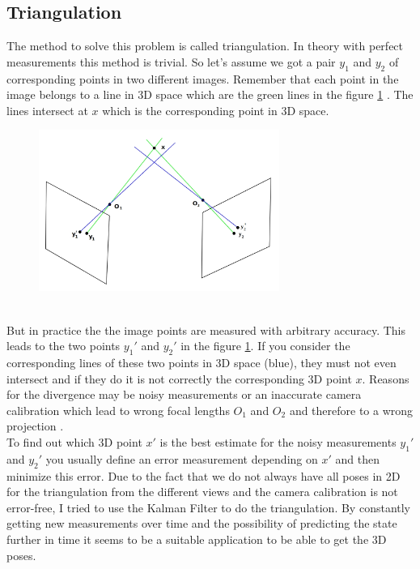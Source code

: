 \subsection{Triangulation}
The method to solve this problem is called triangulation. In theory with perfect measurements this method is trivial. So let's assume we got a pair $y_1$ and $y_2$ of corresponding points in two different images. Remember that each point in the image belongs to a line in 3D space which are the green lines in the figure \ref{fig:triangulation}  \cite{triangulation}. The lines intersect at $x$ which is the corresponding point in 3D space. 
\begin{figure}[h]
	\centering
	\includegraphics[width=0.7\textwidth]{./images/TriangulationReal.jpg}
	\label{fig:triangulation}
\end{figure}\\
But in practice the the image points are measured with arbitrary accuracy. This leads to the two points $y_1'$ and $y_2'$ in the figure \ref{fig:triangulation}. If you consider the corresponding lines of these two points in 3D space (blue), they must not even intersect and if they do it is not correctly the corresponding 3D point $x$. Reasons for the divergence may be noisy measurements or an inaccurate camera calibration which lead to wrong focal lengths $O_1$ and $O_2$ and therefore to a wrong projection \cite{triangulation}. \\

To find out which 3D point $x'$  is the best estimate for the noisy measurements $y_1'$ and $y_2'$ you usually define an error measurement depending on $x'$ and then minimize this error. Due to the fact that we do not always have all poses in 2D for the triangulation from the different views and the camera calibration is not error-free, I tried to use the Kalman Filter to do the triangulation. By constantly getting new measurements over time and the possibility of predicting the state further in time it seems to be a suitable application to be able to get the 3D poses. 


